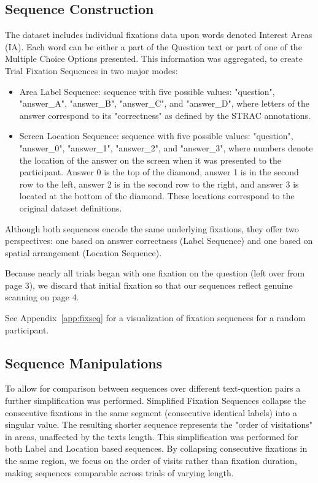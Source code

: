 \documentclass{article}
\begin{document}
    \subsection{Sequence Construction}
    The dataset includes individual fixations data upon words denoted Interest Areas (IA). Each word can be either a part of the Question text or part of one of the Multiple Choice Options presented. This information was aggregated, to create Trial Fixation Sequences in two major modes:
    \begin{itemize}
        \item Area Label Sequence: sequence with five possible values: "question", "answer\_A", "answer\_B", "answer\_C", and "answer\_D", where letters of the answer correspond to its "correctness" as defined by the STRAC annotations. 
        \item Screen Location Sequence: sequence with five possible values: "question", "answer\_0", "answer\_1", "answer\_2", and "answer\_3", where numbers denote the location of the answer on the screen when it was presented to the participant. Answer 0 is the top of the diamond, answer 1 is in the second row to the left, answer 2 is in the second row to the right, and answer 3 is located at the bottom of the diamond. These locations correspond to the original dataset definitions. 
    
    \end{itemize}
    Although both sequences encode the same underlying fixations, they offer two perspectives: one based on answer correctness (Label Sequence) and one based on spatial arrangement (Location Sequence). 
    
    Because nearly all trials began with one fixation on the question (left over from page 3), we discard that initial fixation so that our sequences reflect genuine scanning on page 4.

    See Appendix~\ref{app:fixseq} for a visualization of fixation sequences for a random participant. 

    
    \subsection{Sequence Manipulations}

    To allow for comparison between sequences over different text-question pairs a further simplification was performed. Simplified Fixation Sequences collapse the consecutive fixations in the same segment (consecutive identical labels) into a singular value. The resulting shorter sequence represents the "order of visitations" in areas, unaffected by the texts length. This simplification was performed for both Label and Location based sequences. By collapsing consecutive fixations in the same region, we focus on the order of visits rather than fixation duration, making sequences comparable across trials of varying length.
\end{document}
